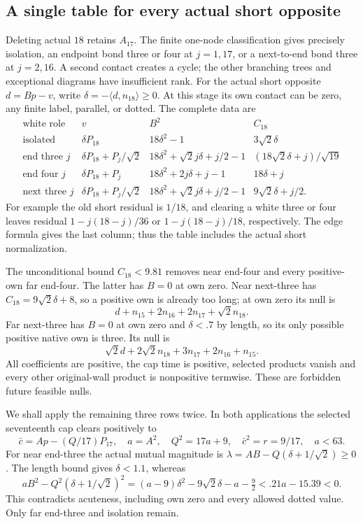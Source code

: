 \documentclass[11pt]{article}
\theoremstyle{definition}
\theoremstyle{remark}
\newcommand{\ip}[2]{\langle #1,#2\rangle}
\begin{document}
\subsection{A single table for every actual short opposite}
\label{app:B18shorttable}
Deleting actual \(18\) retains \(A_{17}\).
The finite one-node classification gives precisely isolation, an
endpoint bond three or four at \(j=1,17\), or a next-to-end bond
three at \(j=2,16\). A second contact creates a cycle; the other
branching trees and exceptional diagrams have insufficient rank.
For the actual short opposite \(d=Bp-v\), write
\(\delta=-\ip d{n_{18}}\geq0\). At this stage its own contact
can be zero, any finite label, parallel, or dotted. The complete data are
\[
\begin{array}{c|c|c|c}
\text{white role}&v&B^2&C_{18}\\ \hline
\text{isolated}&\delta P_{18}&18\delta^2-1&3\sqrt2\delta\\
\text{end three }j&\delta P_{18}+P_j/\sqrt2&
18\delta^2+\sqrt2j\delta+j/2-1&
(18\sqrt2\delta+j)/\sqrt{19}\\
\text{end four }j&\delta P_{18}+P_j&
18\delta^2+2j\delta+j-1&18\delta+j\\
\text{next three }j&\delta P_{18}+P_j/\sqrt2&
18\delta^2+\sqrt2j\delta+j/2-1&9\sqrt2\delta+j/2 .
\end{array}
\]
For example the old short residual is \(1/18\), and clearing a
white three or four leaves residual
\(1-j(18-j)/36\) or \(1-j(18-j)/18\), respectively.
The edge formula gives the last column; thus the table includes
the actual short normalization.

The unconditional bound \(C_{18}<9.81\) removes near end-four
and every positive-own far end-four. The latter has \(B=0\)
at own zero. Near next-three has \(C_{18}=9\sqrt2\delta+8\),
so a positive own is already too long; at own zero its null is
\[
 d+n_{15}+2n_{16}+2n_{17}+\sqrt2n_{18}.
\]
Far next-three has \(B=0\) at own zero and \(\delta<.7\)
by length, so its only possible positive native own is three.
Its null is
\[
 \sqrt2d+2\sqrt2n_{18}+3n_{17}+2n_{16}+n_{15}.
\]
All coefficients are positive, the cap time is positive,
selected products vanish and every other original-wall product
is nonpositive termwise. These are forbidden future feasible nulls.

We shall apply the remaining three rows twice. In both applications
the selected seventeenth cap clears positively to
\[
 \bar c=Ap-(Q/17)P_{17},\quad
 a=A^2,\quad Q^2=17a+9,\quad \bar c^2=r=9/17,\quad a<63.
\]
For near end-three the actual mutual magnitude is
\(\lambda=AB-Q(\delta+1/\sqrt2)\geq0\).
The length bound gives \(\delta<1.1\), whereas
\[
 aB^2-Q^2(\delta+1/\sqrt2)^2
 =(a-9)\delta^2-9\sqrt2\delta-a-\tfrac92
 <.21a-15.39<0.
\]
This contradicts acuteness, including own zero and every allowed
dotted value. Only far end-three and isolation remain.
\end{document}
